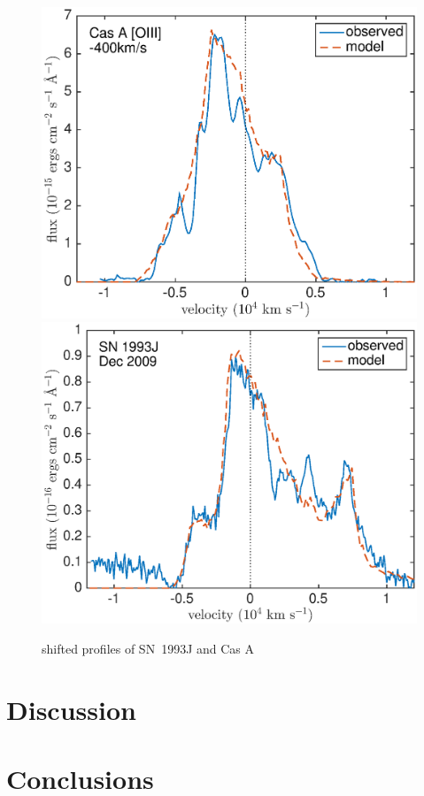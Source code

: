 \begin{figure}
\centering
\includegraphics[scale=0.4,clip=true, trim=20 0 40 20]{chapters/chapter6/figs/CasA/CasA_OIII_v400shift}
\includegraphics[scale=0.4,clip=true, trim=20 0 40 20]{chapters/chapter6/figs/93J/smooth/OIII_shifted_0_3}
\caption{shifted profiles of SN~1993J and Cas A}
\label{shifted}
\end{figure}


\section{Discussion}
\section{Conclusions}








